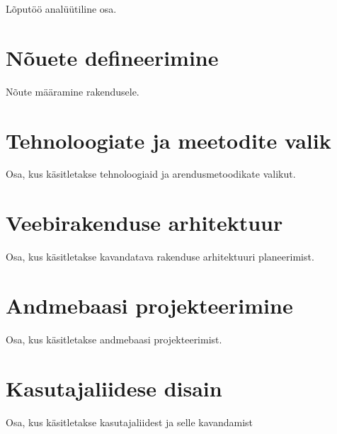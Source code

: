 Lõputöö analüütiline osa.

\section{Nõuete defineerimine}
Nõute määramine rakendusele.

\section{Tehnoloogiate ja meetodite valik}
Osa, kus käsitletakse tehnoloogiaid ja arendusmetoodikate valikut.

\section{Veebirakenduse arhitektuur}
Osa, kus käsitletakse kavandatava rakenduse arhitektuuri planeerimist.

\section{Andmebaasi projekteerimine}
Osa, kus käsitletakse andmebaasi projekteerimist.

\section{Kasutajaliidese disain}
Osa, kus käsitletakse kasutajaliidest ja selle kavandamist